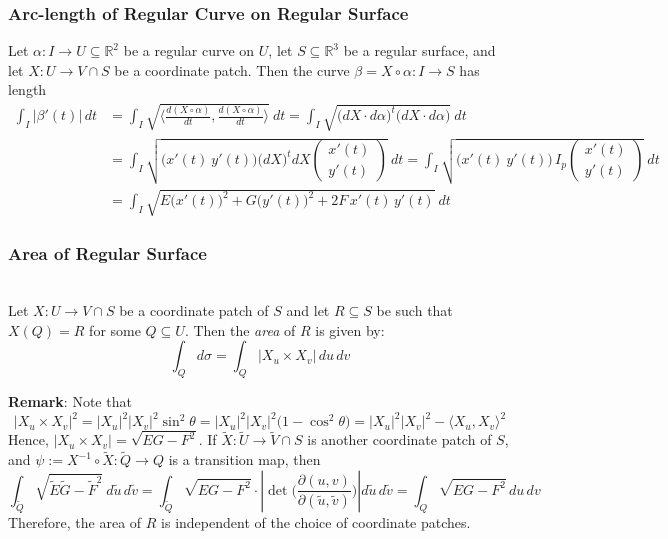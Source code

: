 \subsubsection{Arc-length of Regular Curve on Regular Surface}

\begin{proposition}
Let $\alpha: I\to U\subseteq\mathbb{R}^2$ be a regular curve on $U$, let $S\subseteq\mathbb{R}^3$ be a regular surface, and let $X: U\to V\cap S$ be a coordinate patch. Then the curve $\beta = X\circ\alpha: I\to S$ has length
\begin{align*}
    \int_I\big|\beta'(t)\big|\,dt &= \int_I\sqrt{\Big\langle\frac{d(X\circ\alpha)}{dt}, \frac{d(X\circ\alpha)}{dt}\Big\rangle}\ dt = \int_I\sqrt{\big(dX\cdot d\alpha\big)^t\big(dX\cdot d\alpha\big)}\ dt\\
    &= \int_I\sqrt{\big(x'(t)\ y'(t)\big)\big(dX\big)^t dX\begin{pmatrix}x'(t)\\ y'(t)\end{pmatrix}}\ dt = \int_I\sqrt{\big(x'(t)\ y'(t)\big)\,I_p\begin{pmatrix}x'(t)\\ y'(t)\end{pmatrix}}\ dt\\
    &= \int_I\sqrt{E\big(x'(t)\big)^2 + G\big(y'(t)\big)^2 + 2F\,x'(t)\,y'(t)}\ dt
\end{align*}
\end{proposition}

\subsubsection{Area of Regular Surface}

\\
Let $X: U\to V\cap S$ be a coordinate patch of $S$ and let $R\subseteq S$ be such that $X(Q) = R$ for some $Q\subseteq U$. Then the \textit{area} of $R$ is given by:
\[
\int_Q d\sigma = \int_Q\big|X_u\times X_v\big|\,du\,dv
\]

\noindent\textbf{Remark}: Note that
\[
\big|X_u\times X_v\big|^2 = |X_u|^2|X_v|^2\sin^2\theta = |X_u|^2|X_v|^2\big(1 - \cos^2\theta\big) = |X_u|^2|X_v|^2 - \langle X_u, X_v\rangle^2
\]
Hence, $\big|X_u\times X_v\big| = \sqrt{EG - F^2}$. If $\tilde{X}: \tilde{U}\to\tilde{V}\cap S$ is another coordinate patch of $S$, and $\psi := X^{-1}\circ\tilde{X}: \tilde{Q}\to Q$ is a transition map, then
\[
\int_{\tilde{Q}}\sqrt{\tilde{E}\tilde{G} - \tilde{F}^2}\ d\tilde{u}\,d\tilde{v} = \int_{\tilde{Q}}\sqrt{EG - F^2}\cdot\left|\det\big(\frac{\partial(u, v)}{\partial(\tilde{u}, \tilde{v})}\big)\right|d\tilde{u}\,d\tilde{v} = \int_Q\sqrt{EG - F^2}\,du\,dv
\]
Therefore, the area of $R$ is independent of the choice of coordinate patches.

